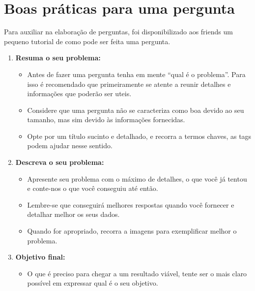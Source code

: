 \chapter{Boas práticas para uma pergunta}
\label{boapergunta}
 
Para auxiliar na elaboração de perguntas, foi disponibilizado aos \glspl{friend} um pequeno tutorial de como pode ser feita uma pergunta. 

\begin{enumerate}
\item \textbf{Resuma o seu problema:} 
\begin{itemize}
\item Antes de fazer uma pergunta tenha em mente ``qual é o problema''. Para isso é recomendado que primeiramente se atente a reunir detalhes e informações que poderão ser uteis.
\item Considere que uma pergunta não se caracteriza como boa devido ao seu tamanho, mas sim devido às informações fornecidas.
\item Opte por um título sucinto e detalhado, e recorra a termos chaves, as tags podem ajudar nesse sentido.
\end{itemize}
\item \textbf{Descreva o seu problema:}
\begin{itemize}
\item Apresente seu problema com o máximo de detalhes, o que você já tentou e conte-nos o que você conseguiu até então.
\item Lembre-se que conseguirá melhores respostas quando você fornecer e detalhar melhor os seus dados.
\item Quando for apropriado, recorra a imagens para exemplificar melhor o problema.
\end{itemize}
\item \textbf{Objetivo final:}
\begin{itemize}
\item O que é preciso para chegar a um resultado viável, tente ser o mais claro possível em expressar qual é o seu objetivo.
\end{itemize}

\end{enumerate}